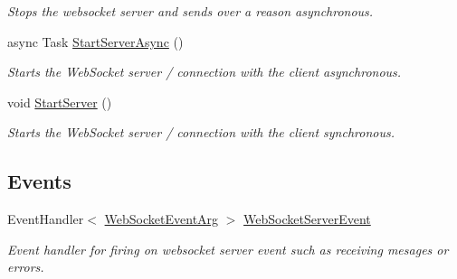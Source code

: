 \begin{DoxyCompactItemize}
\begin{DoxyCompactList}\small\item\em Stops the websocket server and sends over a reason asynchronous. \end{DoxyCompactList}\item 
async Task \mbox{\hyperlink{class_simple_web_socket_server_library_1_1_w_socket_server_1_1_web_socket_server_ade70132fb8fb9150d8366eec2b9831e4}{Start\+Server\+Async}} ()
\begin{DoxyCompactList}\small\item\em Starts the Web\+Socket server / connection with the client asynchronous. \end{DoxyCompactList}\item 
void \mbox{\hyperlink{class_simple_web_socket_server_library_1_1_w_socket_server_1_1_web_socket_server_a8fd29cfd7fd558b6f397c317385f6674}{Start\+Server}} ()
\begin{DoxyCompactList}\small\item\em Starts the Web\+Socket server / connection with the client synchronous. \end{DoxyCompactList}\end{DoxyCompactItemize}
\subsection*{Events}
\begin{DoxyCompactItemize}
\item 
Event\+Handler$<$ \mbox{\hyperlink{class_simple_web_socket_server_library_1_1_web_socket_event_arg}{Web\+Socket\+Event\+Arg}} $>$ \mbox{\hyperlink{class_simple_web_socket_server_library_1_1_w_socket_server_1_1_web_socket_server_a6fbda1ede55611bd2e293f27998b21c3}{Web\+Socket\+Server\+Event}}
\begin{DoxyCompactList}\small\item\em Event handler for firing on websocket server event such as receiving mesages or errors. \end{DoxyCompactList}\end{DoxyCompactItemize}
